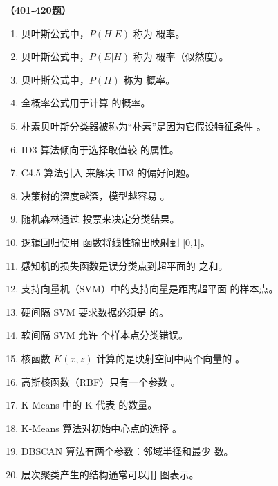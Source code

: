 \vspace{1em}
\textbf{（401-420题）}
\begin{enumerate}[resume,leftmargin=2em,itemsep=1pt]
\item 贝叶斯公式中，$P(H|E)$ 称为 \underline{\hspace{3em}} 概率。
\item 贝叶斯公式中，$P(E|H)$ 称为 \underline{\hspace{3em}} 概率（似然度）。
\item 贝叶斯公式中，$P(H)$ 称为 \underline{\hspace{3em}} 概率。
\item 全概率公式用于计算 \underline{\hspace{3em}} 的概率。
\item 朴素贝叶斯分类器被称为“朴素”是因为它假设特征条件 \underline{\hspace{3em}}。
\item ID3 算法倾向于选择取值较 \underline{\hspace{3em}} 的属性。
\item C4.5 算法引入 \underline{\hspace{3em}} 来解决 ID3 的偏好问题。
\item 决策树的深度越深，模型越容易 \underline{\hspace{3em}}。
\item 随机森林通过 \underline{\hspace{3em}} 投票来决定分类结果。
\item 逻辑回归使用 \underline{\hspace{3em}} 函数将线性输出映射到 [0,1]。
\item 感知机的损失函数是误分类点到超平面的 \underline{\hspace{3em}} 之和。
\item 支持向量机（SVM）中的支持向量是距离超平面 \underline{\hspace{3em}} 的样本点。
\item 硬间隔 SVM 要求数据必须是 \underline{\hspace{3em}} 的。
\item 软间隔 SVM 允许 \underline{\hspace{3em}} 个样本点分类错误。
\item 核函数 $K(x, z)$ 计算的是映射空间中两个向量的 \underline{\hspace{3em}}。
\item 高斯核函数（RBF）只有一个参数 \underline{\hspace{3em}}。
\item K-Means 中的 K 代表 \underline{\hspace{3em}} 的数量。
\item K-Means 算法对初始中心点的选择 \underline{\hspace{3em}}。
\item DBSCAN 算法有两个参数：邻域半径和最少 \underline{\hspace{3em}} 数。
\item 层次聚类产生的结构通常可以用 \underline{\hspace{3em}} 图表示。
\end{enumerate}

